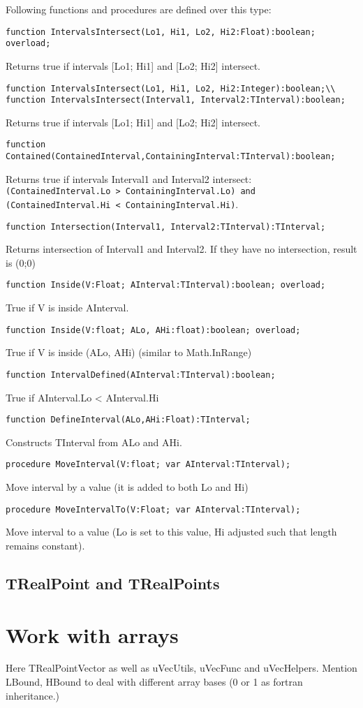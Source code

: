 \documentclass[12pt,a4paper,oneside]{report}
\newcommand{\code}[1]{\texttt{#1}}
\begin{document}
Following functions and procedures are defined over this type:
\begin{lstlisting}
function IntervalsIntersect(Lo1, Hi1, Lo2, Hi2:Float):boolean; overload;
\end{lstlisting}
Returns true if intervals [Lo1; Hi1] and [Lo2; Hi2] intersect.
\begin{lstlisting}
function IntervalsIntersect(Lo1, Hi1, Lo2, Hi2:Integer):boolean;\\
function IntervalsIntersect(Interval1, Interval2:TInterval):boolean;
\end{lstlisting}	
Returns true if intervals [Lo1; Hi1] and [Lo2; Hi2] intersect.
\begin{lstlisting}
function Contained(ContainedInterval,ContainingInterval:TInterval):boolean;
\end{lstlisting}	
Returns true if intervals Interval1 and Interval2 intersect: \\
 \code{(ContainedInterval.Lo > ContainingInterval.Lo) and \\
 (ContainedInterval.Hi < ContainingInterval.Hi)}.
\begin{lstlisting}
function Intersection(Interval1, Interval2:TInterval):TInterval;
\end{lstlisting}	
Returns intersection of Interval1 and Interval2. If they have no intersection, result is (0;0)
\begin{lstlisting}
function Inside(V:Float; AInterval:TInterval):boolean; overload;
\end{lstlisting}	
True if V is inside AInterval.
\begin{lstlisting}
function Inside(V:float; ALo, AHi:float):boolean; overload;
\end{lstlisting}	
True if V is inside (ALo, AHi) (similar to Math.InRange)
\begin{lstlisting}
function IntervalDefined(AInterval:TInterval):boolean;
\end{lstlisting}	
True if AInterval.Lo < AInterval.Hi
\begin{lstlisting}
function DefineInterval(ALo,AHi:Float):TInterval;
\end{lstlisting}	
Constructs TInterval from ALo and AHi.
\begin{lstlisting}
procedure MoveInterval(V:float; var AInterval:TInterval);
\end{lstlisting}	
Move interval by a value (it is added to both Lo and Hi)
\begin{lstlisting}
procedure MoveIntervalTo(V:Float; var AInterval:TInterval);
\end{lstlisting}	
Move interval to a value (Lo is set to this value, Hi adjusted such that length remains constant).
\section{TRealPoint and TRealPoints}
\chapter{Work with arrays}
Here TRealPointVector as well as uVecUtils, uVecFunc and uVecHelpers. Mention LBound, HBound to deal with different array bases (0 or 1 as fortran inheritance.)
	  
\end{document}
